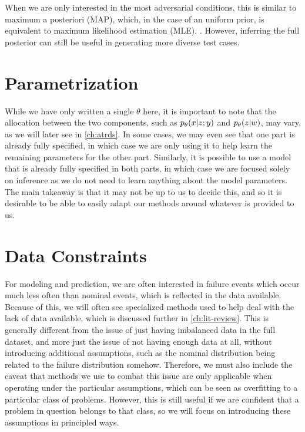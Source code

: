 When we are only interested in the most adversarial conditions, this is similar to maximum a posteriori (MAP), which, in the case of an uniform prior, is equivalent to maximum likelihood estimation (MLE). \cite{efron_hastie_2016}. However, inferring the full posterior can still be useful in generating more diverse test cases.


\section{Parametrization}
\label{sec:intro-param}

While we have only written a single $\theta$ here, it is important to note that the allocation between the two components, such as $\pld{x\given z;y}$ and $\pld{z\given w}$, may vary, as we will later see in \cref{ch:atrds}. In some cases, we may even see that one part is already fully specified, in which case we are only using it to help learn the remaining parameters for the other part. Similarly, it is possible to use a model that is already fully specified in both parts, in which case we are focused solely on inference as we do not need to learn anything about the model parameters. The main takeaway is that it may not be up to us to decide this, and so it is desirable to be able to easily adapt our methods around whatever is provided to us.


\section{Data Constraints}
\label{sec:intro-constraints}

For modeling and prediction, we are often interested in failure events which occur much less often than nominal events, which is reflected in the data available. Because of this, we will often see specialized methods used to help deal with the lack of data available, which is discussed further in \cref{ch:lit-review}. This is generally different from the issue of just having imbalanced data in the full dataset, and more just the issue of not having enough data at all, without introducing additional assumptions, such as the nominal distribution being related to the failure distribution somehow. Therefore, we must also include the caveat that methods we use to combat this issue are only applicable when operating under the particular assumptions, which can be seen as overfitting to a particular class of problems. However, this is still useful if we are confident that a problem in question belongs to that class, so we will focus on introducing these assumptions in principled ways.


